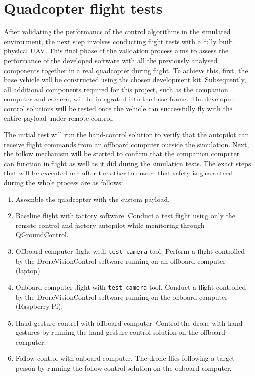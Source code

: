 \section{Quadcopter flight tests}

After validating the performance of the control algorithms in the simulated environment, the next step involves conducting flight tests with a fully built physical UAV. This final phase of the validation process aims to assess the performance of the developed software with all the previously analysed components together in a real quadcopter during flight. To achieve this, first, the base vehicle will be constructed using the chosen development kit. Subsequently, all additional components required for this project, such as the companion computer and camera, will be integrated into the base frame. The developed control solutions will be tested once the vehicle can successfully fly with the entire payload under remote control.

The initial test will run the hand-control solution to verify that the autopilot can receive flight commands from an offboard computer outside the simulation. Next, the follow mechanism will be started to confirm that the companion computer can function in flight as well as it did during the simulation tests. The exact steps that will be executed one after the other to ensure that safety is guaranteed during the whole process are as follows:
\begin{enumerate}
    \item Assemble the quadcopter with the custom payload.
    \item Baseline flight with factory software. Conduct a test flight using only the remote control and factory autopilot while monitoring through QGroundControl.
    \item Offboard computer flight with \texttt{test-camera} tool. Perform a flight controlled by the DroneVisionControl software running on an offboard computer (laptop).
    \item Onboard computer flight with \texttt{test-camera} tool. Conduct a flight controlled by the DroneVisionControl software running on the onboard computer (Raspberry Pi).
    \item Hand-gesture control with offboard computer. Control the drone with hand gestures by running the hand-gesture control solution on the offboard computer.
    \item Follow control with onboard computer. The drone flies following a target person by running the follow control solution on the onboard computer.
\end{enumerate}


